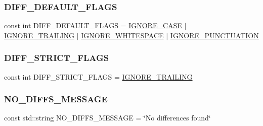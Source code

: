 \subsubsection{\texorpdfstring{D\+I\+F\+F\+\_\+\+D\+E\+F\+A\+U\+L\+T\+\_\+\+F\+L\+A\+GS}{DIFF\_DEFAULT\_FLAGS}}
{\footnotesize\ttfamily const int D\+I\+F\+F\+\_\+\+D\+E\+F\+A\+U\+L\+T\+\_\+\+F\+L\+A\+GS = \mbox{\hyperlink{namespacediff_ab3b1c38517a62ce7edefba7b93b406dda743829c4dd20c98f1a4db5f83106d839}{I\+G\+N\+O\+R\+E\+\_\+\+C\+A\+SE}} $\vert$ \mbox{\hyperlink{namespacediff_ab3b1c38517a62ce7edefba7b93b406dda4cf05931c8f25fb17d9f490c6bd67d70}{I\+G\+N\+O\+R\+E\+\_\+\+T\+R\+A\+I\+L\+I\+NG}} $\vert$ \mbox{\hyperlink{namespacediff_ab3b1c38517a62ce7edefba7b93b406ddab94634739aa9d0705e2eb7976a969a20}{I\+G\+N\+O\+R\+E\+\_\+\+W\+H\+I\+T\+E\+S\+P\+A\+CE}} $\vert$ \mbox{\hyperlink{namespacediff_ab3b1c38517a62ce7edefba7b93b406dda84e6a2f9f288157ed7a207dc744e1d46}{I\+G\+N\+O\+R\+E\+\_\+\+P\+U\+N\+C\+T\+U\+A\+T\+I\+ON}}}

\mbox{\label{namespacediff_aada938db21bf68a19d23eca0fddc551b}} 
\subsubsection{\texorpdfstring{D\+I\+F\+F\+\_\+\+S\+T\+R\+I\+C\+T\+\_\+\+F\+L\+A\+GS}{DIFF\_STRICT\_FLAGS}}
{\footnotesize\ttfamily const int D\+I\+F\+F\+\_\+\+S\+T\+R\+I\+C\+T\+\_\+\+F\+L\+A\+GS = \mbox{\hyperlink{namespacediff_ab3b1c38517a62ce7edefba7b93b406dda4cf05931c8f25fb17d9f490c6bd67d70}{I\+G\+N\+O\+R\+E\+\_\+\+T\+R\+A\+I\+L\+I\+NG}}}

\mbox{\label{namespacediff_a4f8bdb0eae6c54a481aba9358db1e9ab}} 
\subsubsection{\texorpdfstring{N\+O\+\_\+\+D\+I\+F\+F\+S\+\_\+\+M\+E\+S\+S\+A\+GE}{NO\_DIFFS\_MESSAGE}}
{\footnotesize\ttfamily const std\+::string N\+O\+\_\+\+D\+I\+F\+F\+S\+\_\+\+M\+E\+S\+S\+A\+GE = \char`\"{}No differences found\char`\"{}}

